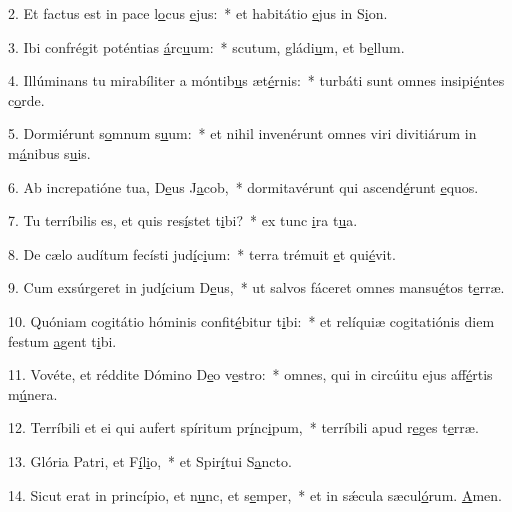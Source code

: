 2. Et factus est in pace l\uline{o}cus \uline{e}jus:~* et habitátio \uline{e}jus in S\uline{i}on.\par 
3. Ibi confrégit poténtias \uline{á}rc\uline{u}um:~* scutum, gládi\uline{u}m, et b\uline{e}llum.\par 
4. Illúminans tu mirabíliter a móntib\uline{u}s æt\uline{é}rnis:~* turbáti sunt omnes insipi\uline{é}ntes c\uline{o}rde.\par 
5. Dormiérunt s\uline{o}mnum s\uline{u}um:~* et nihil invenérunt omnes viri divitiárum in m\uline{á}nibus s\uline{u}is.\par 
6. Ab increpatióne tua, D\uline{e}us J\uline{a}cob,~* dormitavérunt qui ascend\uline{é}runt \uline{e}quos.\par 
7. Tu terríbilis es, et quis res\uline{í}stet t\uline{i}bi?~* ex tunc \uline{i}ra t\uline{u}a.\par 
8. De cælo audítum fecísti jud\uline{í}c\uline{i}um:~* terra trémuit \uline{e}t qui\uline{é}vit.\par 
9. Cum exsúrgeret in jud\uline{í}cium D\uline{e}us,~* ut salvos fáceret omnes mansu\uline{é}tos t\uline{e}rræ.\par 
10. Quóniam cogitátio hóminis confit\uline{é}bitur t\uline{i}bi:~* et relíquiæ cogitatiónis diem festum \uline{a}gent t\uline{i}bi.\par 
11. Vovéte, et réddite Dómino D\uline{e}o v\uline{e}stro:~* omnes, qui in circúitu ejus aff\uline{é}rtis m\uline{ú}nera.\par 
12. Terríbili et ei qui aufert spíritum pr\uline{í}nc\uline{i}pum,~* terríbili apud r\uline{e}ges t\uline{e}rræ.\par 
13. Glória Patri, et F\uline{í}l\uline{i}o,~* et Spir\uline{í}tui S\uline{a}ncto.\par 
14. Sicut erat in princípio, et n\uline{u}nc, et s\uline{e}mper,~* et in sǽcula sæcul\uline{ó}rum. \uline{A}men.\par 
